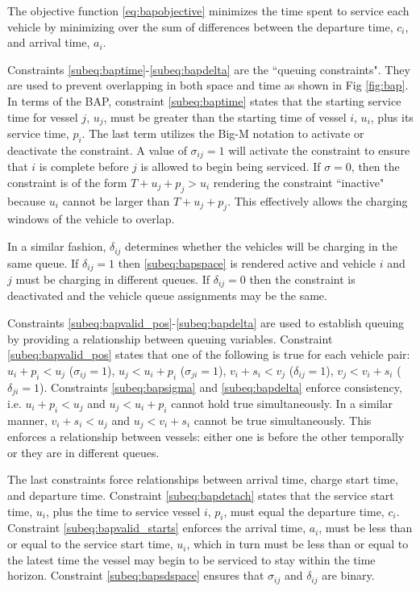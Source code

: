 \documentclass[letterpaper, 10pt, conference]{IEEEtran}
\begin{document}
The objective function \eqref{eq:bapobjective} minimizes the time spent to service each vehicle by minimizing over the sum of differences between the departure time, $c_i$, and arrival time, $a_i$.

Constraints \ref{subeq:baptime}-\ref{subeq:bapdelta} are the ``queuing constraints". They are used to prevent overlapping in both space and time as shown in Fig \ref{fig:bap}. In terms of the BAP, constraint \eqref{subeq:baptime} states that the starting service time for vessel $j$, $u_j$, must be greater than the starting time of vessel $i$, $u_i$, plus its service time, $p_i$. The last term utilizes the Big-M notation to activate or deactivate the constraint. A value of $\sigma_{ij} = 1$ will activate the constraint to ensure that $i$ is complete before $j$ is allowed to begin being serviced. If $\sigma = 0$, then the constraint is of the form $T + u_j + p_j > u_i$ rendering the constraint ``inactive" because $u_i$ cannot be larger than $T + u_j + p_j$. This effectively allows the charging windows of the vehicle to overlap.

In a similar fashion, $\delta_{ij}$ determines whether the vehicles will be charging in the same queue. If $\delta_{ij} = 1$ then \eqref{subeq:bapspace} is rendered active and vehicle $i$ and $j$ must be charging in different queues. If $\delta_{ij} = 0$ then the constraint is deactivated and the vehicle queue assignments may be the same.

Constraints \ref{subeq:bapvalid_pos}-\ref{subeq:bapdelta} are used to establish queuing by providing a relationship between queuing variables. Constraint \eqref{subeq:bapvalid_pos} states that one of the following is true for each vehicle pair: $u_i + p_i < u_j$ ($\sigma_{ij} = 1$), $u_j < u_i + p_i$ ($\sigma_{ji} = 1$), $v_i + s_i < v_j$ ($\delta_{ij} = 1$), $v_j < v_i + s_i$ ($\delta_{ji} = 1$). Constraints \eqref{subeq:bapsigma} and \eqref{subeq:bapdelta} enforce consistency, i.e. $u_i + p_i < u_j$ and $u_j < u_i + p_i$ cannot hold true simultaneously. In a similar manner, $v_i + s_i < u_j$ and $u_j < v_i + s_i$ cannot be true simultaneously. This enforces a relationship between vessels: either one is before the other temporally or they are in different queues.

The last constraints force relationships between arrival time, charge start time, and departure time. Constraint \eqref{subeq:bapdetach} states that the service start time, $u_i$, plus the time to service vessel $i$, $p_i$, must equal the departure time, $c_i$. Constraint \eqref{subeq:bapvalid_starts} enforces the arrival time, $a_i$, must be less than or equal to the service start time, $u_i$, which in turn must be less than or equal to the latest time the vessel may begin to be serviced to stay within the time horizon. Constraint \eqref{subeq:bapsdspace} ensures that $\sigma_{ij}$ and $\delta_{ij}$ are binary.
\end{document}

